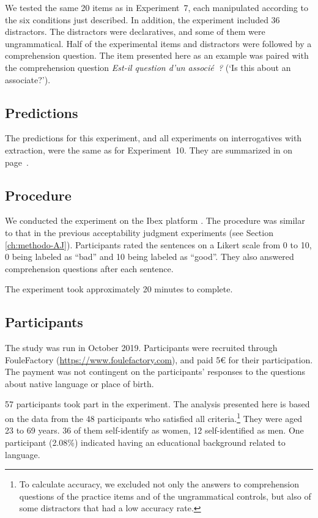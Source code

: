 \zl 

We tested the same 20 items as in Experiment~7, each manipulated according to the six conditions just described. In addition, the experiment included 36 distractors. The distractors were declaratives, and some of them were ungrammatical. Half of the experimental items and distractors were followed by a comprehension question. The item presented here as an example was paired with the comprehension question \emph{Est-il question d'un associé~?} (`Is this about an associate?').

\subsection{Predictions}

The predictions for this experiment, and all experiments on interrogatives with extraction, were the same as for Experiment~10. They are summarized in  on page~\pageref{tab:exp10-predictions}.

\subsection{Procedure} 

We conducted the experiment on the Ibex platform \citep{Ibex}. The procedure was similar to that in the previous acceptability judgment experiments (see Section \ref{ch:methodo-AJ}). Participants rated the sentences on a Likert scale from 0 to 10, 0 being labeled as ``bad'' and 10 being labeled as ``good''. They also answered comprehension questions after each sentence.

The experiment took approximately 20 minutes to complete. 

\subsection{Participants}

The study was run in October 2019. 
Participants were recruited through FouleFactory (\url{https://www.foulefactory.com}), and paid 5€ for their participation. The payment was not contingent on the participants' responses to the questions about native language or place of birth.

57 participants took part in the experiment. 
The analysis presented here is based on the data from the 48 participants who satisfied all criteria.\footnote{To calculate accuracy, we excluded not only the answers to comprehension questions of the practice items and of the ungrammatical controls, but also of some distractors that had a low accuracy rate.}
They were aged 23 to 69 years. 36 of them self-identify as women, 12 self-identified as men. One participant (2.08\%) indicated having an educational background related to language.

